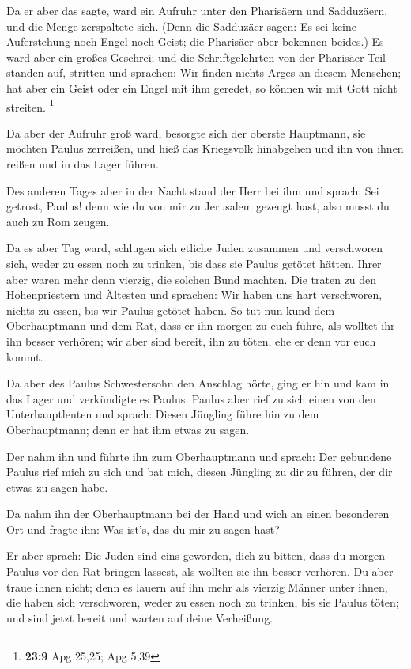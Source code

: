  Da er aber das sagte, ward ein Aufruhr unter den Pharisäern
und Sadduzäern, und die Menge zerspaltete sich.  (Denn die
Sadduzäer sagen: Es sei keine Auferstehung noch Engel noch Geist; die
Pharisäer aber bekennen beides.)  Es ward aber ein großes
Geschrei; und die Schriftgelehrten von der Pharisäer Teil standen auf,
stritten und sprachen: Wir finden nichts Arges an diesem Menschen; hat
aber ein Geist oder ein Engel mit ihm geredet, so können wir mit Gott
nicht streiten. \footnote{\textbf{23:9} Apg 25,25; Apg 5,39}

 Da aber der Aufruhr groß ward, besorgte sich der oberste
Hauptmann, sie möchten Paulus zerreißen, und hieß das Kriegsvolk
hinabgehen und ihn von ihnen reißen und in das Lager führen.

 Des anderen Tages aber in der Nacht stand der Herr bei ihm
und sprach: Sei getrost, Paulus! denn wie du von mir zu Jerusalem
gezeugt hast, also musst du auch zu Rom zeugen.

 Da es aber Tag ward, schlugen sich etliche Juden zusammen
und verschworen sich, weder zu essen noch zu trinken, bis dass sie
Paulus getötet hätten.  Ihrer aber waren mehr denn vierzig,
die solchen Bund machten.  Die traten zu den Hohenpriestern
und Ältesten und sprachen: Wir haben uns hart verschworen, nichts zu
essen, bis wir Paulus getötet haben.  So tut nun kund dem
Oberhauptmann und dem Rat, dass er ihn morgen zu euch führe, als wolltet
ihr ihn besser verhören; wir aber sind bereit, ihn zu töten, ehe er denn
vor euch kommt.

 Da aber des Paulus Schwestersohn den Anschlag hörte, ging
er hin und kam in das Lager und verkündigte es Paulus. 
Paulus aber rief zu sich einen von den Unterhauptleuten und sprach:
Diesen Jüngling führe hin zu dem Oberhauptmann; denn er hat ihm etwas zu
sagen.

 Der nahm ihn und führte ihn zum Oberhauptmann und sprach:
Der gebundene Paulus rief mich zu sich und bat mich, diesen Jüngling zu
dir zu führen, der dir etwas zu sagen habe.

 Da nahm ihn der Oberhauptmann bei der Hand und wich an
einen besonderen Ort und fragte ihn: Was ist's, das du mir zu sagen
hast?

 Er aber sprach: Die Juden sind eins geworden, dich zu
bitten, dass du morgen Paulus vor den Rat bringen lassest, als wollten
sie ihn besser verhören.  Du aber traue ihnen nicht; denn
es lauern auf ihn mehr als vierzig Männer unter ihnen, die haben sich
verschworen, weder zu essen noch zu trinken, bis sie Paulus töten; und
sind jetzt bereit und warten auf deine Verheißung.

